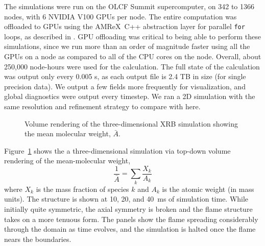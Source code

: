\documentclass[linenumbers,trackchanges]{aastex631}
\newcommand{\amrex}{{\sf AMReX}}
\begin{document}
The simulations were run on the OLCF Summit supercomputer, on 342 to
1366 nodes, with 6 NVIDIA V100 GPUs per node.  The entire computation
was offloaded to GPUs using the \amrex\ C++ abstraction layer for parallel \texttt{for} loops, as described in
\citet{castro_gpu}.  GPU offloading was critical to being able to
perform these simulations, since we run more than an order of
magnitude faster using all the GPUs on a node as compared to all of
the CPU cores on the node.  Overall, about 250,000 node-hours were used for
the calculation.  The full state of the calculation was output only
every 0.005 s, as each output file is 2.4 TB in size (for single
precision data).  We output a few fields more frequently for
visualization, and global diagnostics were output every timestep.  We
ran a 2D simulation with the same resolution and refinement strategy
to compare with here.


\begin{figure}[t]
\centering
{}
\caption{\label{fig:vr_abar} Volume rendering of the three-dimensional XRB
simulation showing the mean molecular weight, $\bar{A}$.  }
\end{figure}

Figure~\ref{fig:vr_abar} shows the a three-dimensional simulation via
top-down volume rendering of the mean-molecular weight,
\begin{equation}
\frac{1}{\bar{A}} = \sum_k \frac{X_k}{A_k}
\end{equation}
where $X_k$ is the mass fraction of species $k$ and $A_k$ is the
atomic weight (in mass units).  The structure is shown at 10, 20, and
40~ms of simulation time.  While initially quite symmetric, the axial
symmetry is broken  and the flame structure takes on a more tenuous
form.  The panels show the flame spreading considerably through the
domain as time evolves, and the simulation is halted once the flame
nears the boundaries.
\begin{figure*}[t]
\centering
{}
\caption{\label{fig:2d_abar} Time-sequence of the two-dimensional axisymmetric
simulation using the same setup as the three-dimensional simulation shown
in Figure~\ref{fig:vr_abar}.  The domain is zoomed in, showing only the left
two-thirds of the surface.}
\end{figure*}
\end{document}
